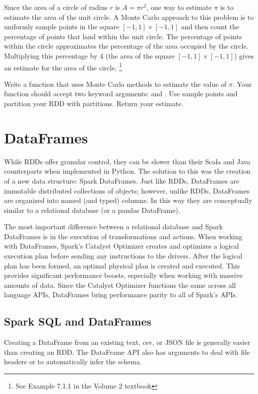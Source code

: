 \begin{problem}
Since the area of a circle of radius $r$ is $A=\pi r^2$, one way to estimate $\pi$ is to estimate the area of the unit circle. A Monte Carlo approach to this problem is to uniformly sample points in the square $[-1,1]\times [-1,1]$ and then count the percentage of points that land within the unit circle. The percentage of points within the circle approximates the percentage of the area occupied by the circle. Multiplying this percentage by 4 (the area of the square $[-1,1]\times [-1,1]$) gives an estimate for the area of the circle.
\footnote{See Example 7.1.1 in the Volume 2 textbook}

Write a function that uses Monte Carlo methods to estimate the value of $\pi$. Your function should accept two keyword arguments:  and . Use  sample points and partition your RDD with  partitions. Return your estimate.
\label{prob:spark-monte-carlo-simulation}
\end{problem}

\section*{DataFrames} %
While RDDs offer granular control, they can be slower than their Scala and Java counterparts when implemented in Python. 
The solution to this was the creation of a new data structure: Spark DataFrames.
Just like RDDs, DataFrames are immutable distributed collections of objects; however, unlike RDDs, DataFrames are organized into named (and typed) columns. In this way they are conceptually similar to a relational database (or a pandas DataFrame).

The most important difference between a relational database and Spark DataFrames is in the execution of transformations and actions. 
When working with DataFrames, Spark's Catalyst Optimizer creates and optimizes a logical execution plan before sending any instructions to the drivers. 
After the logical plan has been formed, an optimal physical plan is created and executed. 
This provides significant performance boosts, especially when working with massive amounts of data. 
Since the Catalyst Optimizer functions the same across all language APIs, DataFrames bring performance parity to all of Spark's APIs.

\subsection*{Spark SQL and DataFrames}
Creating a DataFrame from an existing text, csv, or JSON file is generally easier than creating an RDD.
The DataFrame API also has arguments to deal with file headers or to automatically infer the schema.

